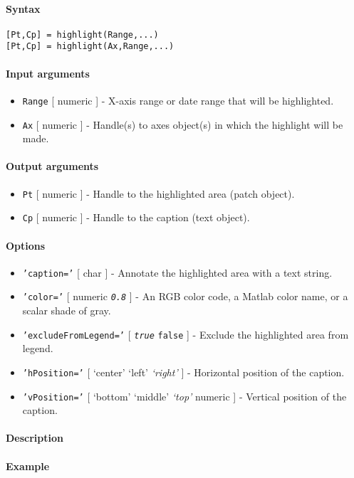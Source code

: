 


	\paragraph{Syntax}\label{syntax}

\begin{verbatim}
[Pt,Cp] = highlight(Range,...)
[Pt,Cp] = highlight(Ax,Range,...)
\end{verbatim}

\paragraph{Input arguments}\label{input-arguments}

\begin{itemize}
\item
  \texttt{Range} {[} numeric {]} - X-axis range or date range that will
  be highlighted.
\item
  \texttt{Ax} {[} numeric {]} - Handle(s) to axes object(s) in which the
  highlight will be made.
\end{itemize}

\paragraph{Output arguments}\label{output-arguments}

\begin{itemize}
\item
  \texttt{Pt} {[} numeric {]} - Handle to the highlighted area (patch
  object).
\item
  \texttt{Cp} {[} numeric {]} - Handle to the caption (text object).
\end{itemize}

\paragraph{Options}\label{options}

\begin{itemize}
\item
  \texttt{'caption='} {[} char {]} - Annotate the highlighted area with
  a text string.
\item
  \texttt{'color='} {[} numeric \textbar{} \emph{\texttt{0.8}} {]} - An
  RGB color code, a Matlab color name, or a scalar shade of gray.
\item
  \texttt{'excludeFromLegend='} {[} \emph{\texttt{true}} \textbar{}
  \texttt{false} {]} - Exclude the highlighted area from legend.
\item
  \texttt{'hPosition='} {[} `center' \textbar{} `left' \textbar{}
  \emph{`right'} {]} - Horizontal position of the caption.
\item
  \texttt{'vPosition='} {[} `bottom' \textbar{} `middle' \textbar{}
  \emph{`top'} \textbar{} numeric {]} - Vertical position of the
  caption.
\end{itemize}

\paragraph{Description}\label{description}

\paragraph{Example}\label{example}


